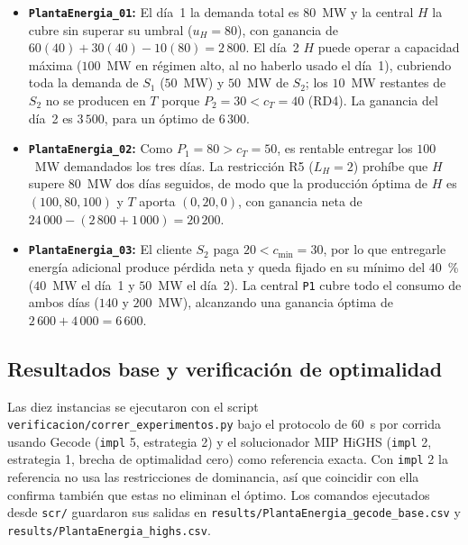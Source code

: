 \begin{itemize}
    \item \textbf{\texttt{PlantaEnergia\_01}:} El d\'ia~1 la demanda total es $80$~MW y la central $H$ la cubre sin superar su umbral ($u_H = 80$), con ganancia de $60(40) + 30(40) - 10(80) = 2\,800$. El d\'ia~2 $H$ puede operar a capacidad m\'axima ($100$~MW en r\'egimen alto, al no haberlo usado el d\'ia~1), cubriendo toda la demanda de $S_1$ ($50$~MW) y $50$~MW de $S_2$; los $10$~MW restantes de $S_2$ no se producen en $T$ porque $P_2 = 30 < c_T = 40$ (RD4). La ganancia del d\'ia~2 es $3\,500$, para un \'optimo de $6\,300$.
    \item \textbf{\texttt{PlantaEnergia\_02}:} Como $P_1 = 80 > c_T = 50$, es rentable entregar los $100$~MW demandados los tres d\'ias. La restricci\'on R5 ($L_H = 2$) proh\'ibe que $H$ supere $80$~MW dos d\'ias seguidos, de modo que la producci\'on \'optima de $H$ es $(100, 80, 100)$ y $T$ aporta $(0, 20, 0)$, con ganancia neta de $24\,000 - (2\,800 + 1\,000) = 20\,200$.
    \item \textbf{\texttt{PlantaEnergia\_03}:} El cliente $S_2$ paga $20 < c_{\min} = 30$, por lo que entregarle energ\'ia adicional produce p\'erdida neta y queda fijado en su m\'inimo del $40$~\% ($40$~MW el d\'ia~1 y $50$~MW el d\'ia~2). La central \texttt{P1} cubre todo el consumo de ambos d\'ias ($140$ y $200$~MW), alcanzando una ganancia \'optima de $2\,600 + 4\,000 = 6\,600$.
\end{itemize}

\subsection{Resultados base y verificaci\'on de optimalidad}

Las diez instancias se ejecutaron con el script \texttt{verificacion/correr\_experimentos.py} bajo el protocolo de 60~s por corrida usando Gecode (\texttt{impl} 5, estrategia 2) y el solucionador MIP HiGHS (\texttt{impl} 2, estrategia 1, brecha de optimalidad cero) como referencia exacta. Con \texttt{impl} 2 la referencia no usa las restricciones de dominancia, as\'i que coincidir con ella confirma tambi\'en que estas no eliminan el \'optimo. Los comandos ejecutados desde \texttt{scr/} guardaron sus salidas en \texttt{results/PlantaEnergia\_gecode\_base.csv} y \texttt{results/PlantaEnergia\_highs.csv}.

